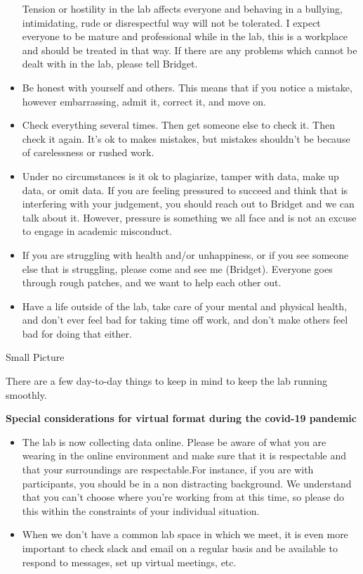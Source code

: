 \documentclass[
]{book}
\providecommand{\tightlist}{%
  \setlength{\itemsep}{0pt}\setlength{\parskip}{0pt}}
\begin{document}
\begin{itemize}
  Tension or hostility in the lab affects everyone and behaving in a bullying, intimidating, rude or disrespectful way will not be tolerated. I expect everyone to be mature and professional while in the lab, this is a workplace and should be treated in that way. If there are any problems which cannot be dealt with in the lab, please tell Bridget.
\item
  Be honest with yourself and others. This means that if you notice a mistake, however embarrassing, admit it, correct it, and move on.
\item
  Check everything several times. Then get someone else to check it. Then check it again. It's ok to makes mistakes, but mistakes shouldn't be because of carelessness or rushed work.
\item
  Under no circumstances is it ok to plagiarize, tamper with data, make up data, or omit data. If you are feeling pressured to succeed and think that is interfering with your judgement, you should reach out to Bridget and we can talk about it. However, pressure is something we all face and is not an excuse to engage in academic misconduct.
\item
  If you are struggling with health and/or unhappiness, or if you see someone else that is struggling, please come and see me (Bridget). Everyone goes through rough patches, and we want to help each other out.
\item
  Have a life outside of the lab, take care of your mental and physical health, and don't ever feel bad for taking time off work, and don't make others feel bad for doing that either.
\end{itemize}

Small Picture

There are a few day-to-day things to keep in mind to keep the lab running smoothly.

\textbf{Special considerations for virtual format during the covid-19 pandemic}

\begin{itemize}
\tightlist
\item
  The lab is now collecting data online. Please be aware of what you are wearing in the online environment and make sure that it is respectable and that your surroundings are respectable.For instance, if you are with participants, you should be in a non distracting background. We understand that you can't choose where you're working from at this time, so please do this within the constraints of your individual situation.
\item
  When we don't have a common lab space in which we meet, it is even more important to check slack and email on a regular basis and be available to respond to messages, set up virtual meetings, etc.
\end{itemize}
\end{document}
